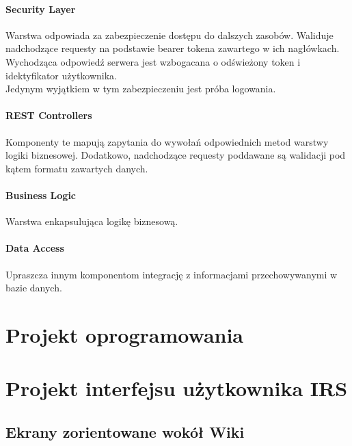 \documentclass{scrreprt}
\begin{document}
\subsubsection{Security Layer}
Warstwa odpowiada za zabezpieczenie dostępu do dalszych zasobów. 
Waliduje nadchodzące requesty na podstawie bearer tokena zawartego w ich nagłówkach.
Wychodząca odpowiedź serwera jest wzbogacana o odświeżony token i idektyfikator użytkownika.\\
Jedynym wyjątkiem w tym zabezpieczeniu jest próba logowania.

\subsubsection{REST Controllers}
Komponenty te mapują zapytania do wywołań odpowiednich metod warstwy logiki biznesowej. 
Dodatkowo, nadchodzące requesty poddawane są walidacji pod kątem formatu zawartych danych.

\subsubsection{Business Logic}
Warstwa enkapsulująca logikę biznesową.

\subsubsection{Data Access}
Upraszcza innym komponentom integrację z informacjami przechowywanymi w bazie danych. 


\chapter{Projekt oprogramowania}
\chapter{Projekt interfejsu użytkownika IRS}

\section{Ekrany zorientowane wokół Wiki}
\begin{center}
\end{center}
\end{document}

